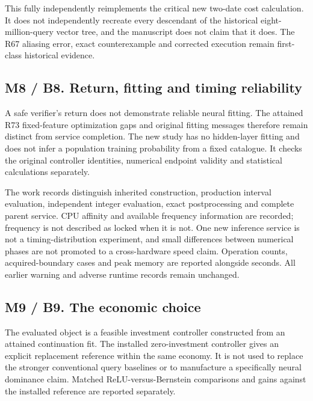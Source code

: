 This fully independently reimplements the critical new two-date cost
calculation. It does not independently recreate every descendant of the
historical eight-million-query vector tree, and the manuscript does not
claim that it does. The R67 aliasing error, exact counterexample and
corrected execution remain first-class historical evidence.

\hypertarget{m8-b8.-return-fitting-and-timing-reliability}{%
\subsection{M8 / B8. Return, fitting and timing
reliability}\label{m8-b8.-return-fitting-and-timing-reliability}}

A safe verifier's return does not demonstrate reliable neural fitting.
The attained R73 fixed-feature optimization gaps and original fitting
messages therefore remain distinct from service completion. The new
study has no hidden-layer fitting and does not infer a population
training probability from a fixed catalogue. It checks the original
controller identities, numerical endpoint validity and statistical
calculations separately.

The work records distinguish inherited construction, production interval
evaluation, independent integer evaluation, exact postprocessing and
complete parent service. CPU affinity and available frequency
information are recorded; frequency is not described as locked when it
is not. One new inference service is not a timing-distribution
experiment, and small differences between numerical phases are not
promoted to a cross-hardware speed claim. Operation counts,
acquired-boundary cases and peak memory are reported alongside seconds.
All earlier warning and adverse runtime records remain unchanged.

\hypertarget{m9-b9.-the-economic-choice}{%
\subsection{M9 / B9. The economic
choice}\label{m9-b9.-the-economic-choice}}

The evaluated object is a feasible investment controller constructed
from an attained continuation fit. The installed zero-investment
controller gives an explicit replacement reference within the same
economy. It is not used to replace the stronger conventional query
baselines or to manufacture a specifically neural dominance claim.
Matched ReLU-versus-Bernstein comparisons and gains against the
installed reference are reported separately.

